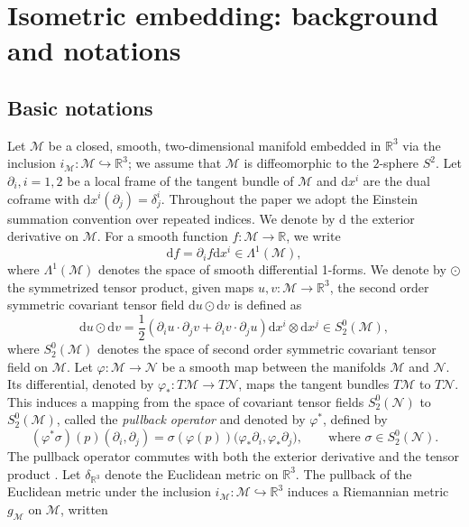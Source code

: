 \documentclass[11pt,a4paper,oneside,reqno]{amsart}
\theoremstyle{definition}
\theoremstyle{plain}
\numberwithin{theorem}{section}
\numberwithin{proposition}{section}
\numberwithin{lemma}{section}
\numberwithin{equation}{section}
\newcommand{\Man}{\mathcal{M}}
\begin{document}
\section{Isometric embedding: background and notations}\label{sec:isoemb}


\subsection{Basic notations}

Let \(\Man\) be a closed, smooth, two-dimensional manifold embedded in \(\mathbb{R}^3\) via the inclusion \(i_{\Man}: \Man \hookrightarrow \mathbb{R}^3\); we assume that $\Man$ is diffeomorphic to the $2$-sphere $S^2$.
Let $\partial_i, i = 1,2$ be a local frame of the tangent bundle of $\Man$ and $\mathrm{d}x^i$ are the dual coframe with $\mathrm{d}x^i(\partial_j) = \delta_j^i$. Throughout the paper we adopt the Einstein summation convention over repeated indices.
We denote by $\mathrm{d}$ the exterior derivative on $\Man$. For a smooth function $f: \Man \rightarrow \mathbb{R}$, we write 
\[ \mathrm{d} f = \partial_i f \mathrm{d} x^i \in \Lambda^1(\Man),  \]
where $\Lambda^1(\Man)$ denotes the space of smooth differential 1-forms. 
We denote by $\odot$ the symmetrized tensor product, given maps $u,v: \Man \rightarrow \mathbb{R}^3$, the second order symmetric covariant tensor field $\mathrm{d} u \odot \mathrm{d} v$ is defined as
\[ \mathrm{d} u \odot \mathrm{d} v = \frac{1}{2}(\partial_i u \cdot \partial_j v 
+ \partial_i v \cdot \partial_j u ) \mathrm{d}x^i \otimes \mathrm{d} x^j \in S_2^0(\Man), \]
where $S_2^0(\Man)$ denotes the space of second order symmetric covariant tensor field on $\Man$.
Let $\varphi: \Man \rightarrow \mathcal{N}$ be a smooth map between the manifolds $\Man$ and $\mathcal{N}$. Its differential, denoted by $\varphi_*: T\Man \rightarrow T\mathcal{N}$, maps the tangent bundles 
$T\Man$ to $T\mathcal{N}$. This induces a mapping from the space of covariant tensor fields $S_2^0(\mathcal{N})$ to $S_2^0(\Man)$, called the \emph{pullback operator} and denoted by $\varphi^*$, defined by
\[
    (\varphi^* \sigma)(p)(\partial_i, \partial_j)
    = \sigma(\varphi(p))\bigl(\varphi_* \partial_i , \varphi_* \partial_j \bigr),
    \qquad \text{where } \sigma \in S_2^0(\mathcal{N}).
\]
The pullback operator commutes with both the exterior derivative and the tensor product \cite{johnlee}. 
Let $\delta_{\mathbb{R}^3}$ denote the Euclidean metric on $\mathbb{R}^3$.
The pullback of the Euclidean metric under the inclusion \(i_{\Man}\!: \Man \hookrightarrow \mathbb{R}^3\) induces a Riemannian metric \(g_{\Man}\) on \(\Man\), written
\end{document}
